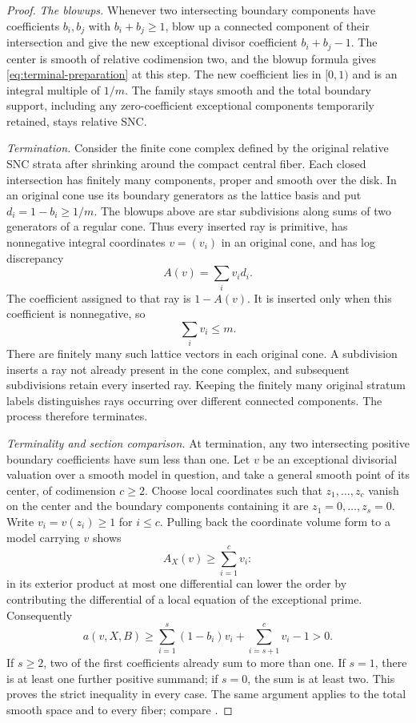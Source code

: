 \documentclass[11pt,a4paper]{article}
\numberwithin{equation}{section}
\theoremstyle{definition}
\theoremstyle{remark}
\begin{document}
\begin{proof}
\emph{The blowups.}
Whenever two intersecting boundary components have coefficients
$b_i,b_j$ with $b_i+b_j\ge1$, blow up a connected component of their
intersection and give the new exceptional divisor coefficient
$b_i+b_j-1$. The center is smooth of relative codimension two, and
the blowup formula gives \eqref{eq:terminal-preparation} at this
step. The new coefficient lies in $[0,1)$ and is an integral multiple
of $1/m$. The family stays smooth and the total boundary support,
including any zero-coefficient exceptional components temporarily
retained, stays relative SNC.

\smallskip\noindent\emph{Termination.}
Consider the finite cone complex defined by the
original relative SNC strata after shrinking around the compact
central fiber. Each closed intersection has finitely many components,
proper and smooth over the disk. In an original cone use its boundary generators as
the lattice basis and put $d_i=1-b_i\ge1/m$. The blowups above are
star subdivisions along sums of two generators of a regular cone.
Thus every inserted ray is primitive, has nonnegative integral
coordinates $v=(v_i)$ in an original cone, and has log discrepancy
\[
 A(v)=\sum_i v_id_i.
\]
The coefficient assigned to that ray is $1-A(v)$. It is inserted only
when this coefficient is nonnegative, so
\[
 \sum_i v_i\le m.
\]
There are finitely many such lattice vectors in each original cone.
A subdivision inserts a ray not already present in the cone complex,
and subsequent subdivisions retain every inserted ray. Keeping the
finitely many original stratum labels distinguishes rays occurring
over different connected components. The process therefore terminates.

\smallskip\noindent\emph{Terminality and section comparison.}
At termination, any two intersecting positive boundary coefficients
have sum less than one. Let $v$ be an exceptional divisorial
valuation over a
smooth model in question, and take a general smooth point of its
center, of codimension $c\ge2$. Choose local coordinates such that
$z_1,\ldots,z_c$ vanish on the center and the boundary components
containing it are $z_1=0,\ldots,z_s=0$. Write $v_i=v(z_i)\ge1$ for
$i\le c$. Pulling back the coordinate volume form to a model carrying
$v$ shows
\[
 A_X(v)\ge\sum_{i=1}^c v_i:
\]
in its exterior product at most one differential can lower the order
by contributing the differential of a local equation of the
exceptional prime. Consequently
\begin{equation}\label{eq:snc-terminal-valuation}
 a(v,X,B)\ge
 \sum_{i=1}^s(1-b_i)v_i+\sum_{i=s+1}^c v_i-1>0.
\end{equation}
If $s\ge2$, two of the first coefficients already sum to more than
one. If $s=1$, there is at least one further positive summand; if
$s=0$, the sum is at least two. This proves the strict inequality in
every case. The same argument applies to the total smooth space and
to every fiber; compare \cite[Corollary~2.31]{KM1998}.


\end{proof}
\end{document}
